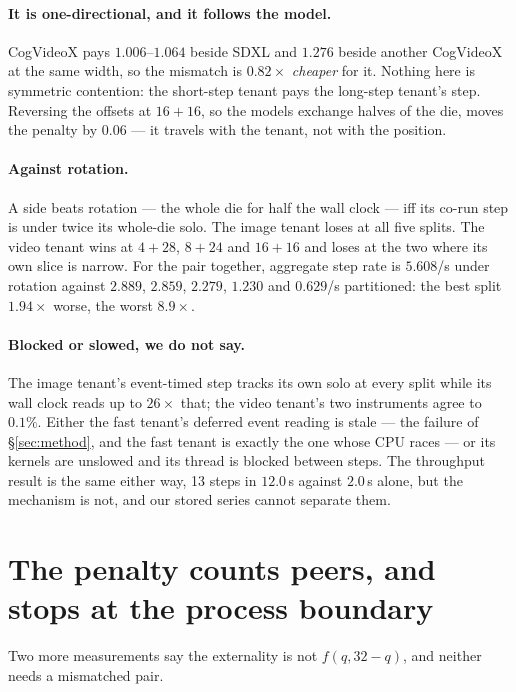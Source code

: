 \documentclass[sigconf,nonacm]{acmart}
\begin{document}
\paragraph{It is one-directional, and it follows the model.} CogVideoX
pays $1.006$--$1.064$ beside SDXL and $1.276$ beside another CogVideoX at
the same width, so the mismatch is $0.82\times$ \emph{cheaper} for it.
Nothing here is symmetric contention: the short-step tenant pays the
long-step tenant's step. Reversing the offsets at $16{+}16$, so the
models exchange halves of the die, moves the penalty by $0.06$ --- it
travels with the tenant, not with the position.

\paragraph{Against rotation.} A side beats rotation --- the whole die for
half the wall clock --- iff its co-run step is under twice its whole-die
solo. The image tenant loses at all five splits. The video tenant wins at
$4{+}28$, $8{+}24$ and $16{+}16$ and loses at the two where its own slice
is narrow. For the pair together, aggregate step rate is $5.608$/s under
rotation against $2.889$, $2.859$, $2.279$, $1.230$ and $0.629$/s
partitioned: the best split $1.94\times$ worse, the worst $8.9\times$.

\paragraph{Blocked or slowed, we do not say.} The image tenant's
event-timed step tracks its own solo at every split while its wall clock
reads up to $26\times$ that; the video tenant's two instruments agree to
$0.1\%$. Either the fast tenant's deferred event reading is stale --- the
failure of \S\ref{sec:method}, and the fast tenant is exactly the one
whose CPU races --- or its kernels are unslowed and its thread is blocked
between steps. The throughput result is the same either way, 13 steps in
$12.0$\,s against $2.0$\,s alone, but the mechanism is not, and our
stored series cannot separate them.

\section{The penalty counts peers, and stops at the process boundary}
\label{sec:peers}

Two more measurements say the externality is not $f(q, 32-q)$, and
neither needs a mismatched pair.
\end{document}
